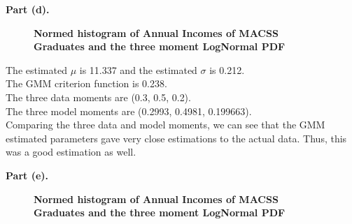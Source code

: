 \documentclass[letterpaper,12pt]{article}
\theoremstyle{definition}
\begin{document}
\pagebreak
\textbf{Part (d).} \\
\flushleft 
\begin{figure}[htb]\centering\captionsetup{width=4.0in}
  \caption{\textbf{Normed histogram of Annual Incomes of MACSS Graduates and the three moment LogNormal PDF}}\label{FigExample}
\end{figure}
\flushleft 
The estimated $\mu$ is 11.337 and the estimated $\sigma$ is 0.212.\\
The GMM criterion function is 0.238.\\
The three data moments are (0.3, 0.5, 0.2).\\
The three model moments are (0.2993, 0.4981, 0.199663).\\
Comparing the three data and model moments, we can see that the GMM estimated parameters gave very close estimations to the actual data. Thus, this was a good estimation as well. 

\pagebreak

\textbf{Part (e).} \\
\begin{figure}[htb]\centering\captionsetup{width=4.0in}
  \caption{\textbf{Normed histogram of Annual Incomes of MACSS Graduates and the three moment LogNormal PDF}}\label{FigExample}
\end{figure}
\flushleft
\end{document}
